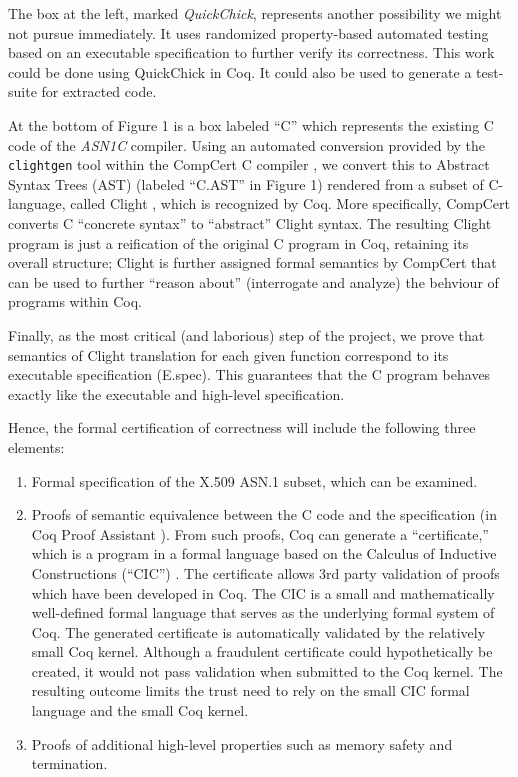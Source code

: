 \documentclass[acmsmall,nonacm]{acmart}
\begin{document}
The box at the left, marked \textit{QuickChick}, represents another
possibility we might not pursue immediately. It uses randomized
property-based automated testing based on an executable
specification to further verify its correctness. This work could be
done using QuickChick \cite{QuickChick} in Coq. It could also be used
to generate a test-suite for extracted code.

At the bottom of Figure 1 is a box labeled ``C'' which represents the
existing C code of the \emph{ASN1C} compiler. Using an automated conversion
provided by the \texttt{clightgen} tool within the CompCert C compiler
\cite{CompCert}, we convert this to Abstract Syntax Trees (AST)
\cite{AST} (labeled ``C.AST'' in Figure 1) rendered from a subset
of C-language, called Clight \cite{Mechanized}, which is recognized by Coq. More specifically,
CompCert converts C ``concrete syntax'' to ``abstract'' Clight
syntax. The resulting Clight program is just a reification of the
original C program in Coq, retaining its overall structure; Clight is further assigned formal semantics
by CompCert that can be used to further ``reason about'' (interrogate
and analyze) the behviour of programs within Coq.



Finally, as the most critical (and laborious) step of the project, we
prove that semantics of Clight
translation for each given function correspond to its executable
specification (E.spec). This guarantees that the C program behaves exactly
like the executable and high-level specification.

Hence, the formal certification of correctness will include the following
three elements:

\begin{enumerate}[label=(\alph*)]

\item Formal specification of the X.509 ASN.1 subset, which can be examined.

\item Proofs of semantic equivalence between the C code and the
  specification (in Coq Proof Assistant \cite{Coq}). From such
  proofs, Coq can generate a ``certificate,'' which is a program in a
  formal language based on the Calculus of Inductive Constructions
  (``CIC'') \cite{CIC}. The certificate allows 3rd party
  validation of proofs which have been developed in Coq. The CIC is a small and mathematically
  well-defined formal language that serves as the underlying formal
  system of Coq. The generated certificate is automatically validated
  by the relatively small Coq kernel. Although a fraudulent
  certificate could hypothetically be created, it would not pass
  validation when submitted to the Coq kernel. The resulting outcome
  limits the trust need to rely on the small CIC formal language and
  the small Coq kernel.

\item Proofs of additional high-level properties such as memory safety
  and termination.

\end{enumerate}
  
\end{document}
